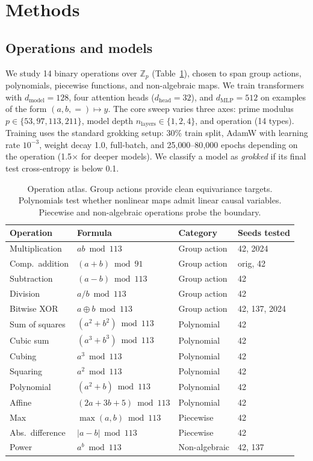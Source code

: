 \documentclass{article}
\newcommand{\Z}{\mathbb{Z}}
\begin{document}
\section{Methods}
\label{sec:methods}

\subsection{Operations and models}

We study 14 binary operations over $\Z_p$ (Table~\ref{tab:operations}), chosen
to span group actions, polynomials, piecewise functions, and non-algebraic maps.
We train transformers with $d_\text{model} = 128$, four attention heads
($d_\text{head} = 32$), and $d_\text{MLP} = 512$ on examples of the form
$(a, b, {=}) \mapsto y$. The core sweep varies three axes: prime modulus
$p \in \{53, 97, 113, 211\}$, model depth $n_\text{layers} \in \{1, 2, 4\}$,
and operation (14 types). Training uses
the standard grokking setup: 30\% train split, AdamW with learning rate
$10^{-3}$, weight decay 1.0, full-batch, and 25{,}000--80{,}000 epochs
depending on the operation (1.5$\times$ for deeper models). We classify a
model as \emph{grokked} if its final test cross-entropy is below 0.1.

\begin{table}[t]
\centering
\small
\begin{tabular}{llll}
\toprule
Operation & Formula & Category & Seeds tested \\
\midrule
Multiplication & $ab \bmod 113$ & Group action & 42, 2024 \\
Comp.\ addition & $(a{+}b) \bmod 91$ & Group action & orig, 42 \\
Subtraction & $(a{-}b) \bmod 113$ & Group action & 42 \\
Division & $a/b \bmod 113$ & Group action & 42 \\
Bitwise XOR & $a \oplus b \bmod 113$ & Group action & 42, 137, 2024 \\
\midrule
Sum of squares & $(a^2{+}b^2) \bmod 113$ & Polynomial & 42 \\
Cubic sum & $(a^3{+}b^3) \bmod 113$ & Polynomial & 42 \\
Cubing & $a^3 \bmod 113$ & Polynomial & 42 \\
Squaring & $a^2 \bmod 113$ & Polynomial & 42 \\
Polynomial & $(a^2{+}b) \bmod 113$ & Polynomial & 42 \\
Affine & $(2a{+}3b{+}5) \bmod 113$ & Polynomial & 42 \\
\midrule
Max & $\max(a,b) \bmod 113$ & Piecewise & 42 \\
Abs.\ difference & $|a{-}b| \bmod 113$ & Piecewise & 42 \\
Power & $a^b \bmod 113$ & Non-algebraic & 42, 137 \\
\bottomrule
\end{tabular}
\caption{Operation atlas. Group actions provide clean equivariance targets.
Polynomials test whether nonlinear maps admit linear causal variables. Piecewise
and non-algebraic operations probe the boundary.}
\label{tab:operations}
\end{table}
\end{document}
